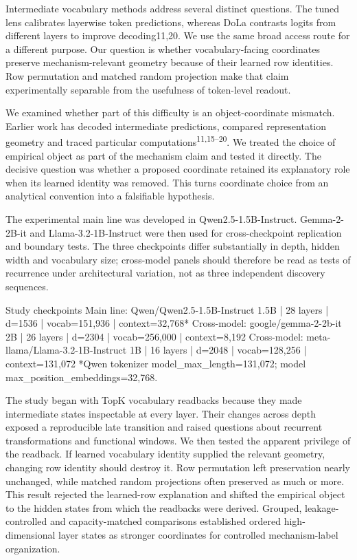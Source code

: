 \documentclass[11pt]{article}
\begin{document}
Intermediate vocabulary methods address several distinct questions. The tuned lens calibrates layerwise token predictions, whereas DoLa contrasts logits from different layers to improve decoding11,20. We use the same broad access route for a different purpose. Our question is whether vocabulary-facing coordinates preserve mechanism-relevant geometry because of their learned row identities. Row permutation and matched random projection make that claim experimentally separable from the usefulness of token-level readout.

We examined whether part of this difficulty is an object-coordinate mismatch. Earlier work has decoded intermediate predictions, compared representation geometry and traced particular computations\textsuperscript{11,15--20}. We treated the choice of empirical object as part of the mechanism claim and tested it directly. The decisive question was whether a proposed coordinate retained its explanatory role when its learned identity was removed. This turns coordinate choice from an analytical convention into a falsifiable hypothesis.

The experimental main line was developed in Qwen2.5-1.5B-Instruct. Gemma-2-2B-it and Llama-3.2-1B-Instruct were then used for cross-checkpoint replication and boundary tests. The three checkpoints differ substantially in depth, hidden width and vocabulary size; cross-model panels should therefore be read as tests of recurrence under architectural variation, not as three independent discovery sequences.

\begin{CodeBlock}

Study checkpoints
Main line:   Qwen/Qwen2.5-1.5B-Instruct
             1.5B | 28 layers | d=1536 | vocab=151,936 | context=32,768*
Cross-model: google/gemma-2-2b-it
             2B | 26 layers | d=2304 | vocab=256,000 | context=8,192
Cross-model: meta-llama/Llama-3.2-1B-Instruct
             1B | 16 layers | d=2048 | vocab=128,256 | context=131,072
*Qwen tokenizer model_max_length=131,072; model max_position_embeddings=32,768.
\end{CodeBlock}

The study began with TopK vocabulary readbacks because they made intermediate states inspectable at every layer. Their changes across depth exposed a reproducible late transition and raised questions about recurrent transformations and functional windows. We then tested the apparent privilege of the readback. If learned vocabulary identity supplied the relevant geometry, changing row identity should destroy it. Row permutation left preservation nearly unchanged, while matched random projections often preserved as much or more. This result rejected the learned-row explanation and shifted the empirical object to the hidden states from which the readbacks were derived. Grouped, leakage-controlled and capacity-matched comparisons established ordered high-dimensional layer states as stronger coordinates for controlled mechanism-label organization.
\end{document}
